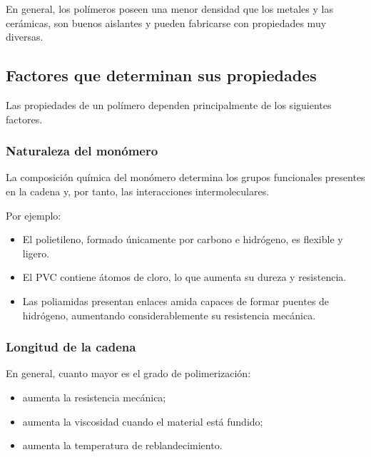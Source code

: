 En general, los polímeros poseen una menor densidad que los metales y las
cerámicas, son buenos aislantes y pueden fabricarse con propiedades muy diversas.


\subsection{Factores que determinan sus propiedades}

Las propiedades de un polímero dependen principalmente de los siguientes factores.

\subsubsection*{Naturaleza del monómero}

La composición química del monómero determina los grupos funcionales presentes en
la cadena y, por tanto, las interacciones intermoleculares.

Por ejemplo:

\begin{itemize}

\item El polietileno, formado únicamente por carbono e hidrógeno, es flexible y
ligero.

\item El PVC contiene átomos de cloro, lo que aumenta su dureza y resistencia.

\item Las poliamidas presentan enlaces amida capaces de formar puentes de
hidrógeno, aumentando considerablemente su resistencia mecánica.

\end{itemize}


\subsubsection*{Longitud de la cadena}

En general, cuanto mayor es el grado de polimerización:

\begin{itemize}

\item aumenta la resistencia mecánica;

\item aumenta la viscosidad cuando el material está fundido;

\item aumenta la temperatura de reblandecimiento.

\end{itemize}

